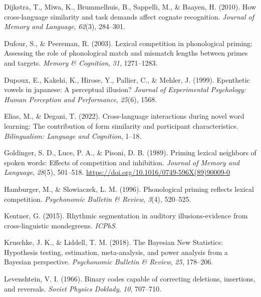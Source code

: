 \documentclass[
]{article}
\newlength{\cslhangindent}
\newenvironment{CSLReferences}[2] %
 {\begin{list}{}{%
  \setlength{\itemindent}{0pt}
  \setlength{\leftmargin}{0pt}
  \setlength{\parsep}{0pt}
  \ifodd #1
   \setlength{\leftmargin}{\cslhangindent}
   \setlength{\itemindent}{-1\cslhangindent}
  \fi
  \setlength{\itemsep}{#2\baselineskip}}}
 {\end{list}}
\begin{document}
\begin{CSLReferences}{1}{0}
Dijkstra, T., Miwa, K., Brummelhuis, B., Sappelli, M., \& Baayen, H.
(2010). How cross-language similarity and task demands affect cognate
recognition. \emph{Journal of Memory and Language}, \emph{62}(3),
284--301.

Dufour, S., \& Peereman, R. (2003). Lexical competition in phonological
priming: {Assessing} the role of phonological match and mismatch lengths
between primes and targets. \emph{Memory \& Cognition}, \emph{31},
1271--1283.

Dupoux, E., Kakehi, K., Hirose, Y., Pallier, C., \& Mehler, J. (1999).
Epenthetic vowels in japanese: A perceptual illusion? \emph{Journal of
Experimental Psychology: Human Perception and Performance},
\emph{25}(6), 1568.

Elias, M., \& Degani, T. (2022). Cross-language interactions during
novel word learning: {The} contribution of form similarity and
participant characteristics. \emph{Bilingualism: Language and
Cognition}, 1--18.

Goldinger, S. D., Luce, P. A., \& Pisoni, D. B. (1989). Priming lexical
neighbors of spoken words: {Effects} of competition and inhibition.
\emph{Journal of Memory and Language}, \emph{28}(5), 501--518.
\url{https://doi.org/10.1016/0749-596X(89)90009-0}

Hamburger, M., \& Slowiaczek, L. M. (1996). Phonological priming
reflects lexical competition. \emph{Psychonomic Bulletin \& Review},
\emph{3}(4), 520--525.

Kentner, G. (2015). Rhythmic segmentation in auditory illusions-evidence
from cross-linguistic mondegreens. \emph{ICPhS}.

Kruschke, J. K., \& Liddell, T. M. (2018). The {Bayesian New
Statistics}: {Hypothesis} testing, estimation, meta-analysis, and power
analysis from a {Bayesian} perspective. \emph{Psychonomic Bulletin \&
Review}, \emph{25}, 178--206.

Levenshtein, V. I. (1966). Binary codes capable of correcting deletions,
insertions, and reversals. \emph{Soviet Physics Doklady}, \emph{10},
707--710.


\end{CSLReferences}
\end{document}
